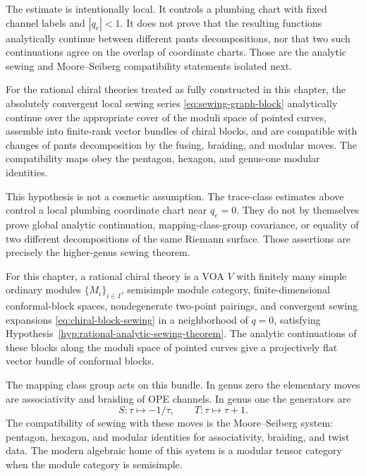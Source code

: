The estimate is intentionally local.  It controls a plumbing chart with
fixed channel labels and \(|q_e|<1\).  It does not prove that the resulting
functions analytically continue between different pants decompositions, nor
that two such continuations agree on the overlap of coordinate charts.  Those
are the analytic sewing and Moore--Seiberg compatibility statements isolated
next.

\begin{hypothesis}
\label{hyp:rational-analytic-sewing-theorem}
For the rational chiral theories treated as fully constructed in this
chapter, the absolutely convergent local sewing series
\eqref{eq:sewing-graph-block} analytically continue over the appropriate
cover of the moduli space of pointed curves, assemble into finite-rank vector
bundles of chiral blocks, and are compatible with changes of pants
decomposition by the fusing, braiding, and modular moves.  The compatibility
maps obey the pentagon, hexagon, and genus-one modular identities.
\end{hypothesis}

This hypothesis is not a cosmetic assumption.  The trace-class estimates
above control a local plumbing coordinate chart near \(q_e=0\).  They do not
by themselves prove global analytic continuation, mapping-class-group
covariance, or equality of two different decompositions of the same Riemann
surface.  Those assertions are precisely the higher-genus sewing theorem.

\begin{definition}
\label{def:sewing-compatible-rational-chiral-theory}
For this chapter, a rational chiral theory is a VOA \(V\) with finitely many
simple ordinary modules \(\{M_i\}_{i\in I}\), semisimple module category,
finite-dimensional conformal-block spaces, nondegenerate two-point pairings,
and convergent sewing expansions \eqref{eq:chiral-block-sewing} in a
neighborhood of \(q=0\), satisfying
Hypothesis~\ref{hyp:rational-analytic-sewing-theorem}.  The analytic
continuations of these blocks along the moduli space of pointed curves give a
projectively flat vector bundle of conformal blocks.
\end{definition}

The mapping class group acts on this bundle.  In genus zero the elementary
moves are associativity and braiding of OPE channels.  In genus one the
generators are
\[
  S:\tau\mapsto -1/\tau,\qquad
  T:\tau\mapsto\tau+1.
\]
The compatibility of sewing with these moves is the Moore--Seiberg system:
pentagon, hexagon, and modular identities for associativity, braiding, and
twist data.  The modern algebraic home of this system is a modular tensor
category when the module category is semisimple.

